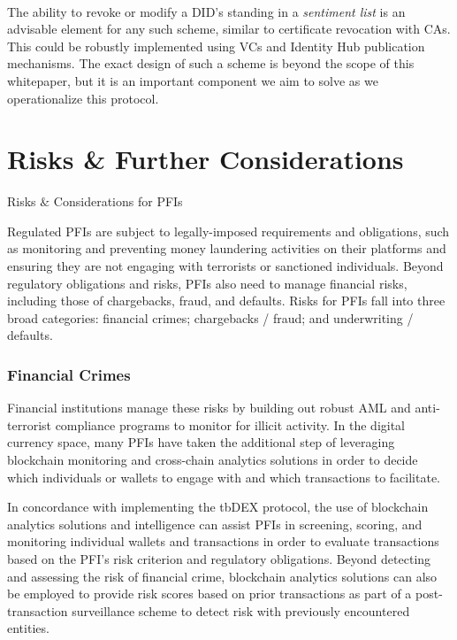 \documentclass[11pt]{article}
\begin{document}
 \\ The ability to revoke or modify a DID’s standing in a \textit{sentiment list} is an advisable element for any such scheme, similar to certificate revocation with CAs. This could be robustly implemented using VCs and Identity Hub publication mechanisms. The exact design of such a scheme is beyond the scope of this whitepaper, but it is an important component we aim to solve as we operationalize this protocol.

\vspace{1\baselineskip}
\section{Risks & Further Considerations}

\vspace{1\baselineskip}
{\LARGE Risks $\&$ Considerations for PFIs}

\vspace{1\baselineskip}
Regulated PFIs are subject to legally-imposed requirements and obligations, such as monitoring and preventing money laundering activities on their platforms and ensuring they are not engaging with terrorists or sanctioned individuals. Beyond regulatory obligations and risks, PFIs also need to manage financial risks, including those of chargebacks, fraud, and defaults.  Risks for PFIs fall into three broad categories: financial crimes; chargebacks / fraud; and underwriting / defaults.

\subsubsection{Financial Crimes}

Financial institutions manage these risks by building out robust AML and anti-terrorist compliance programs to monitor for illicit activity. In the digital currency space, many PFIs have taken the additional step of leveraging blockchain monitoring and cross-chain analytics solutions in order to decide which individuals or wallets to engage with and which transactions to facilitate.

\vspace{1\baselineskip}
In concordance with implementing the tbDEX protocol, the use of blockchain analytics solutions and intelligence can assist PFIs in screening, scoring, and monitoring individual wallets and transactions in order to evaluate transactions based on the PFI’s risk criterion and regulatory obligations. Beyond detecting and assessing the risk of financial crime, blockchain analytics solutions can also be employed to provide risk scores based on prior transactions as part of a post-transaction surveillance scheme to detect risk with previously encountered entities. 
\end{document}
